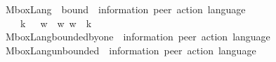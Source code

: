 \begin{isabellebody}
\isanewline
%
\isanewline
{}\isamarkupfalse%
\ MboxLang\ {\isacharcolon}{\kern0pt}{\isacharcolon}{\kern0pt}\ {\isachardoublequoteopen}bound\ {\isasymRightarrow}\ {\isacharparenleft}{\kern0pt}{\isacharprime}{\kern0pt}information{\isacharcomma}{\kern0pt}\ {\isacharprime}{\kern0pt}peer{\isacharparenright}{\kern0pt}\ action\ language{\isachardoublequoteclose}\ \ {\isacharparenleft}{\kern0pt}{\isachardoublequoteopen}{\isasymL}\isactrlbsub {\isacharunderscore}{\kern0pt}\isactrlesub {\isachardoublequoteclose}\ {\isacharbrackleft}{\kern0pt}{}{}{}{\isacharbrackright}{\kern0pt}\ {}{}{}{\isacharparenright}{\kern0pt}\isanewline
\ \ \isanewline
\ \ \ \ {\isachardoublequoteopen}{\isasymL}\isactrlbsub k\isactrlesub \ {\isasymequiv}\ {\isacharbraceleft}{\kern0pt}\ w{\isasymdown}\isactrlsub {\isacharbang}{\kern0pt}\ {\isacharbar}{\kern0pt}\ w{\isachardot}{\kern0pt}\ w\ {\isasymin}\ {\isasymT}\isactrlbsub k\isactrlesub \ {\isacharbraceright}{\kern0pt}{\isachardoublequoteclose}\isanewline
\isanewline
{}\isamarkupfalse%
\ MboxLang{\isacharunderscore}{\kern0pt}bounded{\isacharunderscore}{\kern0pt}by{\isacharunderscore}{\kern0pt}one\ {\isacharcolon}{\kern0pt}{\isacharcolon}{\kern0pt}\ {\isachardoublequoteopen}{\isacharparenleft}{\kern0pt}{\isacharprime}{\kern0pt}information{\isacharcomma}{\kern0pt}\ {\isacharprime}{\kern0pt}peer{\isacharparenright}{\kern0pt}\ action\ language{\isachardoublequoteclose}\ \ {\isacharparenleft}{\kern0pt}{\isachardoublequoteopen}{\isasymL}\isactrlsub {\isasymone}{\isachardoublequoteclose}\ {}{}{}{\isacharparenright}{\kern0pt}\ \isanewline
\ \ {\isachardoublequoteopen}{\isasymL}\isactrlsub {\isasymone}\ {\isasymequiv}\ {\isasymL}\isactrlbsub {\isasymB}\ {}\isactrlesub {\isachardoublequoteclose}\isanewline
\isanewline
{}\isamarkupfalse%
\ MboxLang{\isacharunderscore}{\kern0pt}unbounded\ {\isacharcolon}{\kern0pt}{\isacharcolon}{\kern0pt}\ {\isachardoublequoteopen}{\isacharparenleft}{\kern0pt}{\isacharprime}{\kern0pt}information{\isacharcomma}{\kern0pt}\ {\isacharprime}{\kern0pt}peer{\isacharparenright}{\kern0pt}\ action\ language{\isachardoublequoteclose}\ \ {\isacharparenleft}{\kern0pt}{\isachardoublequoteopen}{\isasymL}\isactrlsub {\isasyminfinity}{\isachardoublequoteclose}\ {}{}{}{\isacharparenright}{\kern0pt}\ \isanewline
\ \ {\isachardoublequoteopen}{\isasymL}\isactrlsub {\isasyminfinity}\ {\isasymequiv}\ {\isasymL}\isactrlbsub {\isasyminfinity}\isactrlesub {\isachardoublequoteclose}\isanewline

\end{isabellebody}
